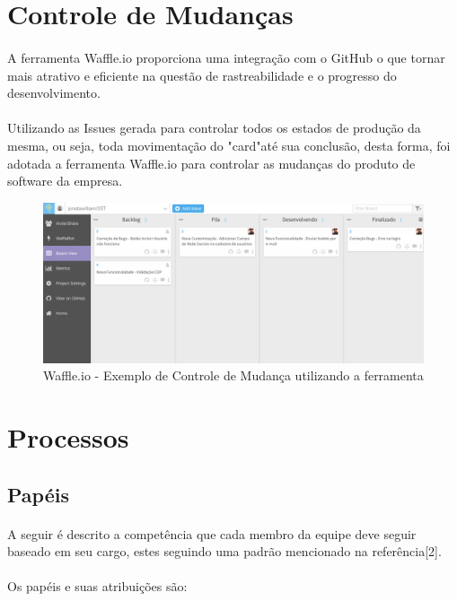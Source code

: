 \documentclass[	DIV=calc,%
							paper=a4,%
							fontsize=12pt,%
							onecolumn]{scrartcl}	 					%
\begin{document}
\section{Controle de Mudanças}
\paragraph{}
A ferramenta Waffle.io proporciona uma integração com o GitHub o que tornar mais atrativo e eficiente na questão de rastreabilidade e o progresso do desenvolvimento. 
\paragraph{}
Utilizando as Issues gerada para controlar todos os estados de produção da mesma, ou seja, toda movimentação do "card"até sua conclusão, desta forma, foi adotada a ferramenta Waffle.io para controlar as mudanças do produto de software da empresa.

\begin{figure}[!h]
	\caption{Waffle.io - Exemplo de Controle de Mudança utilizando a ferramenta}
	\includegraphics[scale=0.36]{waffleio}
\end{figure}

\newpage
\section{Processos}

\subsection{Papéis}
\paragraph{}
A seguir é descrito a competência que cada membro da equipe deve seguir baseado em seu cargo, estes seguindo uma padrão mencionado na referência[2].
\paragraph{}
Os papéis e suas atribuições são:
\end{document}
